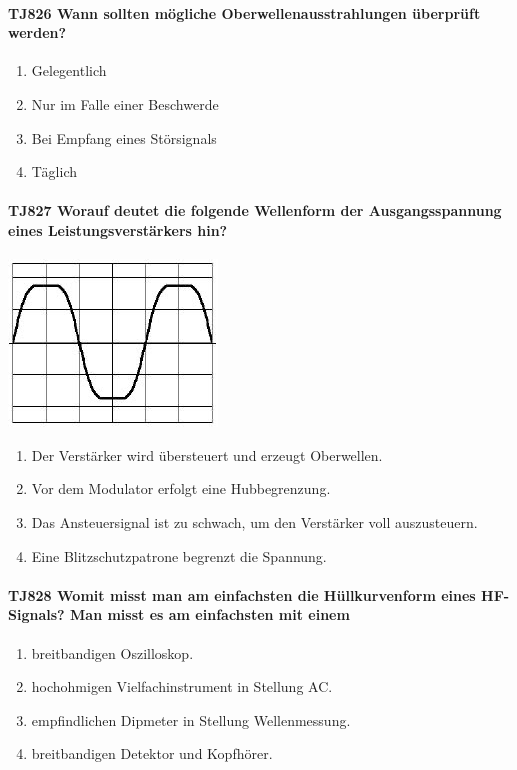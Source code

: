 \documentclass[8pt]{article}
\begin{document}
\paragraph*{TJ826 Wann sollten mögliche Oberwellenausstrahlungen überprüft werden?} 
\begin{enumerate}[nolistsep,label=\Alph*]
\item Gelegentlich
\item Nur im Falle einer Beschwerde
\item Bei Empfang eines Störsignals
\item Täglich
\end{enumerate}

\paragraph*{TJ827 Worauf deutet die folgende Wellenform der Ausgangsspannung eines Leistungsverstärkers hin?}
\begin{center}
	\begin{minipage}{\linewidth}
		\centering
		\includegraphics[scale=1.0]{pics/tj827_a.jpg}
	\end{minipage}
\end{center}
\begin{enumerate}[nolistsep,label=\Alph*]
\item Der Verstärker wird übersteuert und erzeugt Oberwellen.
\item Vor dem Modulator erfolgt eine Hubbegrenzung.
\item Das Ansteuersignal ist zu schwach, um den Verstärker voll auszusteuern.
\item Eine Blitzschutzpatrone begrenzt die Spannung.
\end{enumerate}

\paragraph*{TJ828 Womit misst man am einfachsten die Hüllkurvenform eines HF-Signals? Man misst es am einfachsten mit einem}
\begin{enumerate}[nolistsep,label=\Alph*]
\item breitbandigen Oszilloskop.
\item hochohmigen Vielfachinstrument in Stellung AC.
\item empfindlichen Dipmeter in Stellung Wellenmessung.
\item breitbandigen Detektor und Kopfhörer.
\end{enumerate}
\end{document}
